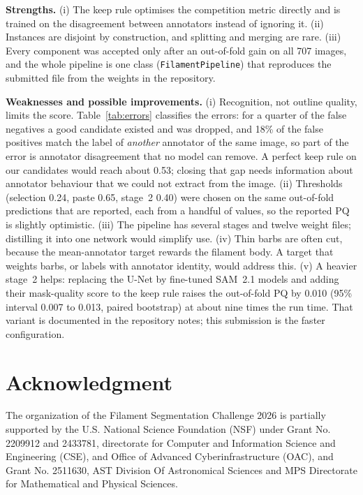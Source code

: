\documentclass[sigconf]{acmart}
\begin{document}
\textbf{Strengths.} (i) The keep rule optimises the competition metric directly and is trained on the disagreement between annotators instead of ignoring it. (ii) Instances are disjoint by construction, and splitting and merging are rare. (iii) Every component was accepted only after an out-of-fold gain on all 707 images, and the whole pipeline is one class (\texttt{FilamentPipeline}) that reproduces the submitted file from the weights in the repository.

\textbf{Weaknesses and possible improvements.} (i) Recognition, not outline quality, limits the score. Table~\ref{tab:errors} classifies the errors: for a quarter of the false negatives a good candidate existed and was dropped, and 18\% of the false positives match the label of \emph{another} annotator of the same image, so part of the error is annotator disagreement that no model can remove. A perfect keep rule on our candidates would reach about 0.53; closing that gap needs information about annotator behaviour that we could not extract from the image. (ii) Thresholds (selection 0.24, paste 0.65, stage~2 0.40) were chosen on the same out-of-fold predictions that are reported, each from a handful of values, so the reported PQ is slightly optimistic. (iii) The pipeline has several stages and twelve weight files; distilling it into one network would simplify use. (iv) Thin barbs are often cut, because the mean-annotator target rewards the filament body. A target that weights barbs, or labels with annotator identity, would address this. (v) A heavier stage~2 helps: replacing the U-Net by fine-tuned SAM~2.1 models and adding their mask-quality score to the keep rule raises the out-of-fold PQ by 0.010 (95\% interval 0.007 to 0.013, paired bootstrap) at about nine times the run time. That variant is documented in the repository notes; this submission is the faster configuration.

\section{Acknowledgment}\label{sec:acknowledgment}
The organization of the Filament Segmentation Challenge 2026 is partially supported by the U.S. National Science Foundation (NSF) under Grant No. 2209912 and 2433781, directorate for Computer and Information Science and Engineering (CSE), and Office of Advanced Cyberinfrastructure (OAC), and Grant No. 2511630, AST Division Of Astronomical Sciences and MPS Directorate for Mathematical and Physical Sciences.
\end{document}
